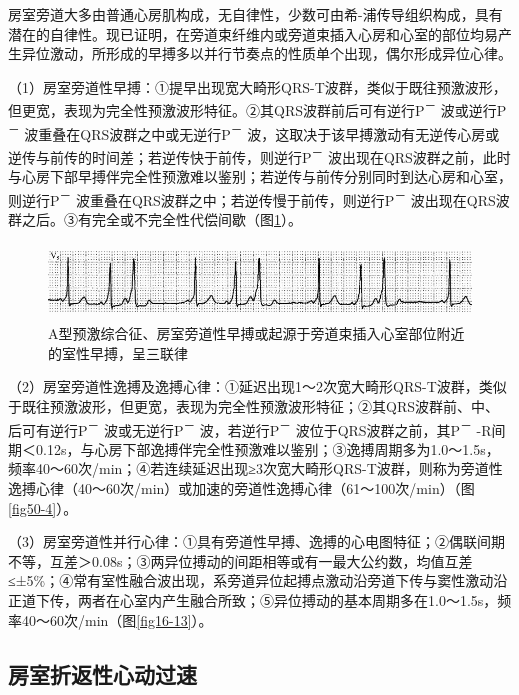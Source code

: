 房室旁道大多由普通心房肌构成，无自律性，少数可由希-浦传导组织构成，具有潜在的自律性。现已证明，在旁道束纤维内或旁道束插入心房和心室的部位均易产生异位激动，所形成的早搏多以并行节奏点的性质单个出现，偶尔形成异位心律。

（1）房室旁道性早搏：①提早出现宽大畸形QRS-T波群，类似于既往预激波形，但更宽，表现为完全性预激波形特征。②其QRS波群前后可有逆行P\textsuperscript{－}
波或逆行P\textsuperscript{－}
波重叠在QRS波群之中或无逆行P\textsuperscript{－}
波，这取决于该早搏激动有无逆传心房或逆传与前传的时间差；若逆传快于前传，则逆行P\textsuperscript{－}
波出现在QRS波群之前，此时与心房下部早搏伴完全性预激难以鉴别；若逆传与前传分别同时到达心房和心室，则逆行P\textsuperscript{－}
波重叠在QRS波群之中；若逆传慢于前传，则逆行P\textsuperscript{－}
波出现在QRS波群之后。③有完全或不完全性代偿间歇（图\ref{fig29-3}）。

\begin{figure}[!htbp]
 \centering
 \includegraphics[width=5.58333in,height=0.79167in]{./images/Image00487.jpg}
 \captionsetup{justification=centering}
 \caption{A型预激综合征、房室旁道性早搏或起源于旁道束插入心室部位附近的室性早搏，呈三联律}
 \label{fig29-3}
  \end{figure} 

（2）房室旁道性逸搏及逸搏心律：①延迟出现1～2次宽大畸形QRS-T波群，类似于既往预激波形，但更宽，表现为完全性预激波形特征；②其QRS波群前、中、后可有逆行P\textsuperscript{－}
波或无逆行P\textsuperscript{－} 波，若逆行P\textsuperscript{－}
波位于QRS波群之前，其P\textsuperscript{－}
-R间期＜0.12s，与心房下部逸搏伴完全性预激难以鉴别；③逸搏周期多为1.0～1.5s，频率40～60次/min；④若连续延迟出现≥3次宽大畸形QRS-T波群，则称为旁道性逸搏心律（40～60次/min）或加速的旁道性逸搏心律（61～100次/min）（图\ref{fig50-4}）。

（3）房室旁道性并行心律：①具有旁道性早搏、逸搏的心电图特征；②偶联间期不等，互差＞0.08s；③两异位搏动的间距相等或有一最大公约数，均值互差≤±5\%；④常有室性融合波出现，系旁道异位起搏点激动沿旁道下传与窦性激动沿正道下传，两者在心室内产生融合所致；⑤异位搏动的基本周期多在1.0～1.5s，频率40～60次/min（图\ref{fig16-13}）。

\protect\hypertarget{text00036.htmlux5cux23subid423}{}{}

\subsection{房室折返性心动过速}

